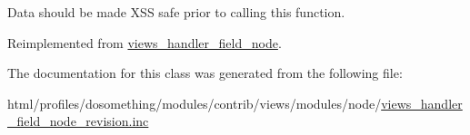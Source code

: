 Data should be made XSS safe prior to calling this function. 

Reimplemented from \hyperlink{classviews__handler__field__node_a0ea7eeac3500e011ae0a83e67f56508d}{views\_\-handler\_\-field\_\-node}.

The documentation for this class was generated from the following file:\begin{DoxyCompactItemize}
\item 
html/profiles/dosomething/modules/contrib/views/modules/node/\hyperlink{views__handler__field__node__revision_8inc}{views\_\-handler\_\-field\_\-node\_\-revision.inc}\end{DoxyCompactItemize}
